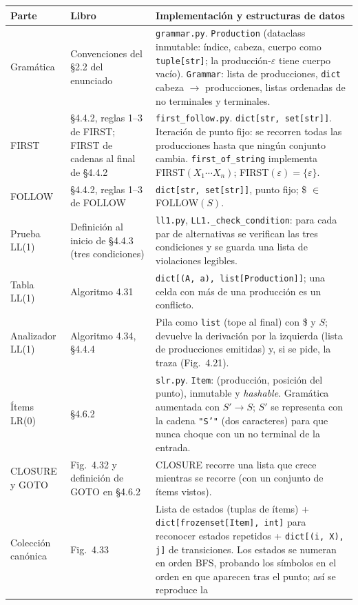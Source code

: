 \documentclass[11pt,a4paper]{article}
\newcommand{\eps}{\varepsilon}
\newcommand{\code}[1]{\texttt{#1}}
\begin{document}
\begin{longtable}{>{\raggedright}p{3.2cm} >{\raggedright}p{4.6cm} p{6.6cm}}
\toprule
\textbf{Parte} & \textbf{Libro} & \textbf{Implementación y estructuras de datos}\\
\midrule\endhead
Gramática & Convenciones del §2.2 del enunciado &
\code{grammar.py}. \code{Production} (dataclass inmutable: índice, cabeza, cuerpo como
\code{tuple[str]}; la producción-$\eps$ tiene cuerpo vacío). \code{Grammar}: lista de
producciones, \code{dict} cabeza $\to$ producciones, listas ordenadas de no terminales y
terminales.\\
FIRST & §4.4.2, reglas 1--3 de FIRST; FIRST de cadenas al final de §4.4.2 &
\code{first\_follow.py}. \code{dict[str, set[str]]}. Iteración de punto fijo: se recorren
todas las producciones hasta que ningún conjunto cambia. \code{first\_of\_string} implementa
FIRST$(X_1\cdots X_n)$; FIRST$(\eps)=\{\eps\}$.\\
FOLLOW & §4.4.2, reglas 1--3 de FOLLOW &
\code{dict[str, set[str]]}, punto fijo; \$ $\in$ FOLLOW$(S)$.\\
Prueba LL(1) & Definición al inicio de §4.4.3 (tres condiciones) &
\code{ll1.py}, \code{LL1.\_check\_condition}: para cada par de alternativas se verifican las
tres condiciones y se guarda una lista de violaciones legibles.\\
Tabla LL(1) & Algoritmo 4.31 &
\code{dict[(A, a), list[Production]]}; una celda con más de una producción es un conflicto.\\
Analizador LL(1) & Algoritmo 4.34, §4.4.4 &
Pila como \code{list} (tope al final) con \$ y $S$; devuelve la derivación por la izquierda (lista
de producciones emitidas) y, si se pide, la traza (Fig.~4.21).\\
Ítems LR(0) & §4.6.2 &
\code{slr.py}. \code{Item}: (producción, posición del punto), inmutable y \emph{hashable}.
Gramática aumentada con $S' \to S$; $S'$ se representa con la cadena \code{"S'"} (dos
caracteres) para que nunca choque con un no terminal de la entrada.\\
CLOSURE y GOTO & Fig.~4.32 y definición de GOTO en §4.6.2 &
CLOSURE recorre una lista que crece mientras se recorre (con un conjunto de ítems vistos).\\
Colección canónica & Fig.~4.33 &
Lista de estados (tuplas de ítems) + \code{dict[frozenset[Item], int]} para reconocer estados
repetidos + \code{dict[(i, X), j]} de transiciones. Los estados se numeran en orden BFS,
probando los símbolos en el orden en que aparecen tras el punto; así se reproduce la

\end{longtable}
\end{document}
